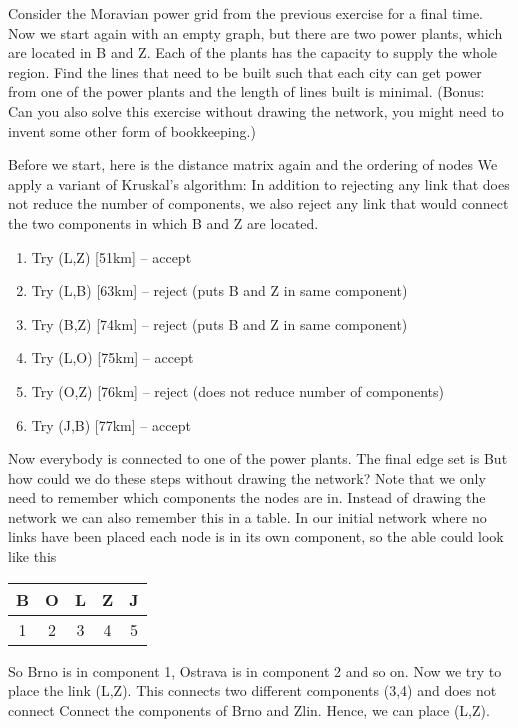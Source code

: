 

Consider the Moravian power grid from the previous exercise for a final time. Now we start again with an empty graph, but there are two power plants, which are located in B and Z. Each of the plants has the capacity to supply the whole region. Find the lines that need to be built such that each city can get power from one of the power plants and the length of lines built is minimal. (Bonus: Can you also solve this exercise without drawing the network, you might need to invent some other form of bookkeeping.)


\solution
Before we start, here is the distance matrix again 
and the ordering of nodes 
We apply a variant of Kruskal's algorithm: In addition to rejecting any link that does not reduce the number of components, we also reject any link that would connect the two components in which B and Z are located.
\begin{enumerate}[label=\arabic*.]
\item Try (L,Z) [51km] -- accept
\item Try (L,B) [63km] -- reject (puts B and Z in same component)
\item Try (B,Z) [74km] -- reject (puts B and Z in same component)
\item Try (L,O) [75km] -- accept
\item Try (O,Z) [76km] -- reject (does not reduce number of components)
\item Try (J,B) [77km] -- accept
\end{enumerate}
Now everybody is connected to one of the power plants. The final edge set is 
But how could we do these steps without drawing the network? Note that we only need to remember which components the nodes are in. Instead of drawing the network we can also remember this in a table. 
In our initial network where no links have been placed each node is in its own component, so the able could look like this 
\begin{center}
\begin{tabular}{c c c c c}
B & O & L & Z & J \\\hline
1 & 2 & 3 & 4 & 5 
\end{tabular}
\end{center}
So Brno is in component 1, Ostrava is in component 2 and so on. Now we try to place the link (L,Z). This connects two different components (3,4) and does not connect Connect the components of Brno and Zlin. Hence, we can place (L,Z). 

